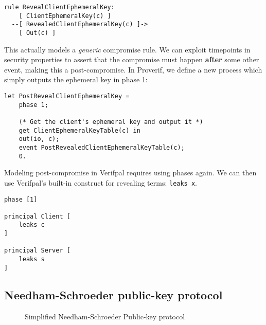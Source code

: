 \lstset{language=tamarin}
\begin{lstlisting}
rule RevealClientEphemeralKey:
    [ ClientEphemeralKey(c) ]
  --[ RevealedClientEphemeralKey(c) ]->
    [ Out(c) ]
\end{lstlisting}

This actually models a \textit{generic} compromise rule. We can exploit timepoints in security properties to assert that the compromise must happen \textbf{after} some other event, making this a post-compromise.
\newpage
In Proverif, we define a new process which simply outputs the ephemeral key in phase 1:

\lstset{language=proverif}
\begin{lstlisting}
let PostRevealClientEphemeralKey =
    phase 1;

    (* Get the client's ephemeral key and output it *)
    get ClientEphemeralKeyTable(c) in
    out(io, c);
    event PostRevealedClientEphemeralKeyTable(c);
    0.
\end{lstlisting}

\lstset{language=verifpal}
Modeling post-compromise in Verifpal requires using phases again. We can then use Verifpal's built-in construct for revealing terms: \lstinline{leaks x}.  
\begin{lstlisting}
phase [1]

principal Client [
    leaks c
]

principal Server [
    leaks s
]
\end{lstlisting}

\subsection{Needham-Schroeder public-key protocol}

\begin{figure}[t]
    \setmscoptions
    \begin{msc}{}
    
    

    \nextlevel[4]


    \nextlevel[3]    
    \nextlevel



    \nextlevel[3]
    \nextlevel[2]

    \end{msc}

    \centering
    \caption{Simplified Needham-Schroeder Public-key protocol}
    \label{fig:NSPK}
\end{figure}

